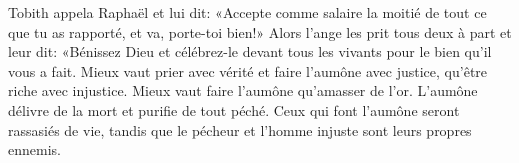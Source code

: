Tobith appela Raphaël et lui dit:
	«Accepte comme salaire la moitié de tout ce que tu as rapporté,
	et va, porte-toi bien!»
Alors l’ange les prit tous deux à part et leur dit:
	«Bénissez Dieu et célébrez-le devant tous les vivants
		pour le bien qu’il vous a fait.
Mieux vaut prier avec vérité et faire l’aumône avec justice,
	qu’être riche avec injustice.
Mieux vaut faire l’aumône qu’amasser de l’or.
	L’aumône délivre de la mort et purifie de tout péché.
Ceux qui font l’aumône seront rassasiés de vie,
	tandis que le pécheur et l’homme injuste sont leurs propres ennemis.
